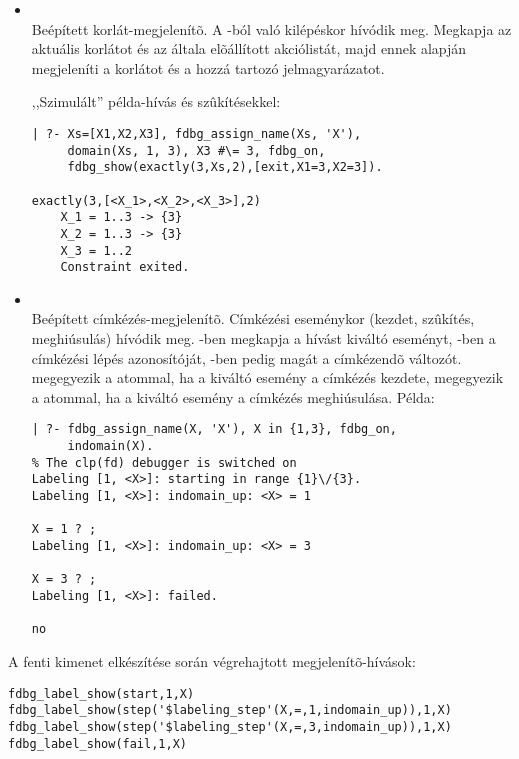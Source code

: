\begin{itemize}
\item {} \\
Beépített korlát-megjelenítõ. A -ból való kilépéskor hívódik
meg. Megkapja az aktuális korlátot és az általa elõállított akciólistát, majd
ennek alapján megjeleníti a korlátot és a hozzá tartozó jelmagyarázatot. 

,,Szimulált'' példa-hívás  és  szûkítésekkel:

\begin{verbatim}
| ?- Xs=[X1,X2,X3], fdbg_assign_name(Xs, 'X'), 
     domain(Xs, 1, 3), X3 #\= 3, fdbg_on, 
     fdbg_show(exactly(3,Xs,2),[exit,X1=3,X2=3]).

exactly(3,[<X_1>,<X_2>,<X_3>],2)
    X_1 = 1..3 -> {3}
    X_2 = 1..3 -> {3}
    X_3 = 1..2
    Constraint exited.
\end{verbatim}

\item {}\\
Beépített címkézés-megjelenítõ. Címkézési eseménykor (kezdet, szûkítés,
meghiúsulás) hívódik meg. -ben megkapja a hívást kiváltó
eseményt, -ben a címkézési lépés azonosítóját, -ben
pedig magát a címkézendõ változót.  megegyezik a
 atommal, ha a kiváltó esemény a címkézés kezdete, megegyezik a 
atommal, ha a kiváltó esemény a címkézés meghiúsulása. Példa:

\begin{verbatim}
| ?- fdbg_assign_name(X, 'X'), X in {1,3}, fdbg_on,
     indomain(X).
% The clp(fd) debugger is switched on
Labeling [1, <X>]: starting in range {1}\/{3}.
Labeling [1, <X>]: indomain_up: <X> = 1

X = 1 ? ;
Labeling [1, <X>]: indomain_up: <X> = 3

X = 3 ? ;
Labeling [1, <X>]: failed.

no
\end{verbatim}

\end{itemize}

A fenti kimenet elkészítése során végrehajtott megjelenítõ-hívások:

\begin{verbatim}
fdbg_label_show(start,1,X)
fdbg_label_show(step('$labeling_step'(X,=,1,indomain_up)),1,X)
fdbg_label_show(step('$labeling_step'(X,=,3,indomain_up)),1,X)
fdbg_label_show(fail,1,X)
\end{verbatim}

